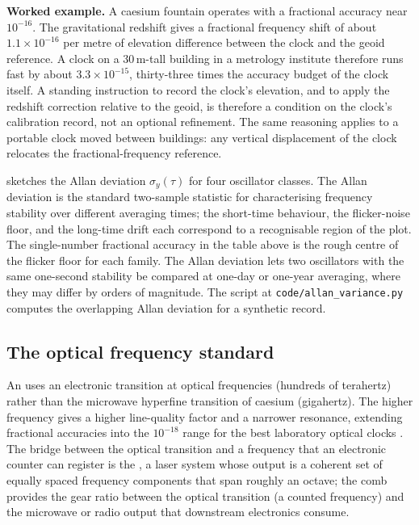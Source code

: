 \textbf{Worked example.} A caesium fountain operates with a
fractional accuracy near $10^{-16}$. The gravitational redshift
gives a fractional frequency shift of about $1.1 \times 10^{-16}$
per metre of elevation difference between the clock and the geoid
reference. A clock on a $30 \,\si{\meter}$-tall building in a
metrology institute therefore runs fast by about $3.3 \times
10^{-15}$, thirty-three times the accuracy budget of the clock
itself. A standing instruction to record the clock's elevation,
and to apply the redshift correction relative to the geoid, is
therefore a condition on the clock's calibration record, not an
optional refinement. The same reasoning applies to a portable
clock moved between buildings: any vertical displacement of the
clock relocates the fractional-frequency reference.

 sketches the Allan deviation
$\sigma_y(\tau)$ for four oscillator classes. The Allan deviation
is the standard two-sample statistic for characterising frequency
stability over different averaging times; the short-time
behaviour, the flicker-noise floor, and the long-time drift each
correspond to a recognisable region of the plot. The single-number
fractional accuracy in the table above is the rough centre of the
flicker floor for each family. The Allan deviation lets two
oscillators with the same one-second stability be compared at
one-day or one-year averaging, where they may differ by orders of
magnitude. The script at \texttt{code/allan\_variance.py} computes
the overlapping Allan deviation for a synthetic record.



\subsection{The optical frequency standard}

An  uses an electronic transition at optical
frequencies (hundreds of terahertz) rather than the microwave
hyperfine transition of caesium (gigahertz). The higher frequency
gives a higher line-quality factor and a narrower resonance,
extending fractional accuracies into the $10^{-18}$ range for the
best laboratory optical clocks
\cite{web:nist-optical-clock}. The bridge between the optical
transition and a frequency that an electronic counter can register
is the , a laser system whose output
is a coherent set of equally spaced frequency components that span
roughly an octave; the comb provides the gear ratio between the
optical transition (a counted frequency) and the microwave or radio
output that downstream electronics consume.

